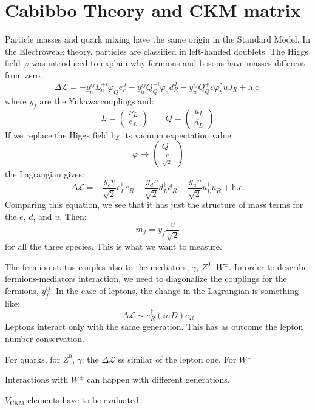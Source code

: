 \documentclass[../../main/main.tex]{subfiles}
\begin{document}

\section{Cabibbo Theory and CKM matrix}
Particle masses and quark mixing have the same origin in the Standard Model. In the Electroweak theory, particles are classified in left-handed doublets. The Higgs field \( \varphi \) was introduced to explain why fermions and bosons have masses different from zero.
\begin{equation}
	\Delta \mathcal{L}
	=
	- y_e^{ij} L_a^{+i} \varphi_Q e^{J}_r - y_{\alpha}^{ij} Q^{+i}_Q \varphi_a d^{J}_R - y_{u}^{ij} Q^{+}_{Q} \varepsilon \varphi^*_b u{J}_R + \text{h.c.}
	\label{eq:}
\end{equation}
where \( y_f \) are the Yukawa couplings and:
\begin{equation}
	L =
	\begin{pmatrix}
		\nu_L \\
		e_L
	\end{pmatrix}
	\qquad
	Q =
	\begin{pmatrix}
		u_L \\
		d_L
	\end{pmatrix}
	\label{eq:}
\end{equation}
If we replace the Higgs field by its vacuum expectation value
\begin{equation}
	\varphi \longrightarrow
	\begin{pmatrix}
		Q \\
		\frac{v}{\sqrt{2}}
	\end{pmatrix}
	\label{eq:}
\end{equation}
the Lagrangian gives:
\begin{equation}
	\Delta \mathcal{L}
	=
	- \frac{y_e v}{\sqrt{2}} e^\dag_L e_R
	- \frac{y_d v}{\sqrt{2}} d^\dag_L d_R
	- \frac{y_u v}{\sqrt{2}} u^\dag_L u_R
	+ \text{h.c.}
	\label{eq:}
\end{equation}
Comparing this equation, we see that it has just the structure of mass terms for the \( e \), \( d \), and \( u \). Then:
\begin{equation}
	m_f
	=
	y_f \frac{v}{\sqrt{2}}
	\label{eq:}
\end{equation}
for all the three species. This is what we want to measure.

The fermion status couples also to the mediators, \( \gamma \), \( Z^0 \), \( W^{\pm} \). In order to describe fermions-mediators interaction, we need to diagonalize the couplings for the fermions, \( y^{ij}_f \). In the case of leptons, the change in the Lagrangian is something like:
\begin{equation}
	\Delta \mathcal{L}
	\sim
	e^\dag_R (i\sigma D) e_R
	\label{eq:}
\end{equation}
Leptons interact only with the same generation. This has as outcome the lepton number conservation.

For quarks, for \( Z^0 \), \( \gamma \): the \( \Delta \mathcal{L} \) ss similar of the lepton one.
For \( W^{\pm} \) %

Interactions with \( W^{\pm} \) can happen with different generations.

\( V_\mathrm{CKM} \) elements have to be evaluated.
\end{document}
